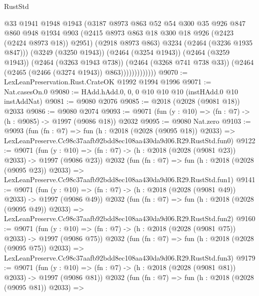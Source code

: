 \begin{lexlean}{RustStd}
\begin{coremodule}
                          @33
                          @1941
                          @1948
                          @1943
                          (@3187
                            @8973
                            @863
                            @52
                            @54
                            @300
                            @35
                            @926
                            @847
                            @860
                            @948
                            @1934
                            @903
                            (@2415 @8973 @863 @18 @300 @18 @926 (@2423 (@2424 @8973 @18)) @2951)
                            (@2918 @8973 @863)
                            @3234
                            (@2464 (@3236 @1935 @847)))
                          (@3249 (@3250 @1943))
                          (@2464 (@3254 @1943))
                          (@2464 (@3259 @1943))
                          (@2464 (@3263 @1943 @738))
                          (@2464 (@3268 @741 @738 @33))
                          (@2464 (@2465 (@2466 (@3274 @1943)) @863)))))))))))))
@9070 := LexLeanPreservation.Rust.CrateOK @1992 @1994 @1996
@9071 := Nat.casesOn.{0}
@9080 := HAdd.hAdd.{0, 0, 0} @10 @10 @10 (instHAdd.{0} @10 instAddNat)
@9081 := @9080 @2076
@9085 := @2018 (@2028 (@9081 @18)) @2033
@9086 := @9080 @2074
@9093 := @9071 (fun (y : @10) => (fn : @7) -> (h : @9085) -> @1997 (@9086 @18)) @2032
@9095 := @9080 Nat.zero
@9103 := @9093
    (fun (fn : @7) =>
    fun (h : @2018 (@2028 (@9095 @18)) @2033) =>
    LexLeanPreserve.Cc98c37aafb92bdd8ec108aa430da9d06.R29.RustStd.fun0)
@9122 := @9071
    (fun (y : @10) => (fn : @7) -> (h : @2018 (@2028 (@9081 @23)) @2033) -> @1997 (@9086 @23))
    @2032
    (fun (fn : @7) =>
    fun (h : @2018 (@2028 (@9095 @23)) @2033) =>
    LexLeanPreserve.Cc98c37aafb92bdd8ec108aa430da9d06.R29.RustStd.fun1)
@9141 := @9071
    (fun (y : @10) => (fn : @7) -> (h : @2018 (@2028 (@9081 @49)) @2033) -> @1997 (@9086 @49))
    @2032
    (fun (fn : @7) =>
    fun (h : @2018 (@2028 (@9095 @49)) @2033) =>
    LexLeanPreserve.Cc98c37aafb92bdd8ec108aa430da9d06.R29.RustStd.fun2)
@9160 := @9071
    (fun (y : @10) => (fn : @7) -> (h : @2018 (@2028 (@9081 @75)) @2033) -> @1997 (@9086 @75))
    @2032
    (fun (fn : @7) =>
    fun (h : @2018 (@2028 (@9095 @75)) @2033) =>
    LexLeanPreserve.Cc98c37aafb92bdd8ec108aa430da9d06.R29.RustStd.fun3)
@9179 := @9071
    (fun (y : @10) => (fn : @7) -> (h : @2018 (@2028 (@9081 @81)) @2033) -> @1997 (@9086 @81))
    @2032
    (fun (fn : @7) =>
    fun (h : @2018 (@2028 (@9095 @81)) @2033) =>

\end{coremodule}
\end{lexlean}
